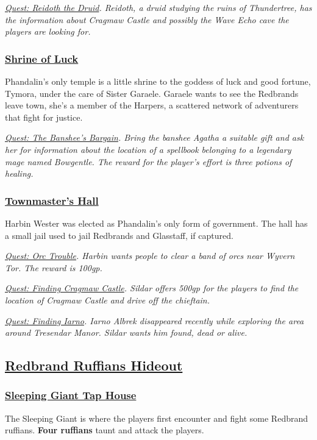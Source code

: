 \emph{\underline{Quest: Reidoth the Druid}. Reidoth, a druid studying the ruins of Thundertree, has the information about Cragmaw Castle and possibly the Wave Echo cave the players are looking for. }

\subsubsection*{\underline{Shrine of Luck}}
Phandalin's only temple is a little shrine to the goddess of luck and good fortune, Tymora, under the care of Sister Garaele. Garaele wants to see the Redbrands leave town, she's a member of the Harpers, a scattered network of adventurers that fight for justice.

\emph{\underline{Quest: The Banshee's Bargain}. Bring the banshee Agatha a suitable gift and ask her for information about the location of a spellbook belonging to a legendary mage named Bowgentle. The reward for the player's effort is three potions of healing. }


\subsubsection*{\underline{Townmaster's Hall}}
Harbin Wester was elected as Phandalin's only form of government. The hall has a small jail used to jail Redbrands and Glasstaff, if captured.

\emph{\underline{Quest: Orc Trouble}. Harbin wants people to clear a band of orcs near Wyvern Tor. The reward is 100gp.}

\emph{\underline{Quest: Finding Cragmaw Castle}. Sildar offers 500gp for the players to find the location of Cragmaw Castle and drive off the chieftain. }

\emph{\underline{Quest: Finding Iarno}. Iarno Albrek disappeared recently while exploring the area around Tresendar Manor. Sildar wants him found, dead or alive.  }

\subsection{\underline{Redbrand Ruffians Hideout}}

\subsubsection*{\underline{Sleeping Giant Tap House}}
The Sleeping Giant is where the players first encounter and fight some Redbrand ruffians. \textbf{Four ruffians} taunt and attack the players.

